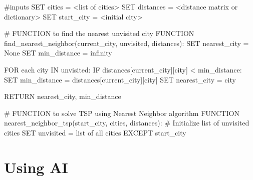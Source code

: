 \documentclass[
  letterpaper,
  DIV=11,
  numbers=noendperiod]{scrreprt}
\newenvironment{Shaded}{\begin{snugshade}}{\end{snugshade}}
\newcommand{\NormalTok}[1]{\textcolor[rgb]{0.00,0.23,0.31}{#1}}
\begin{document}
\begin{Shaded}
\begin{Highlighting}[]
\NormalTok{\#inputs}
\NormalTok{SET cities = \textless{}list of cities\textgreater{}}
\NormalTok{SET distances = \textless{}distance matrix or dictionary\textgreater{}}
\NormalTok{SET start\_city = \textless{}initial city\textgreater{}}


\NormalTok{\# FUNCTION to find the nearest unvisited city}
\NormalTok{FUNCTION find\_nearest\_neighbor(current\_city, unvisited, distances):}
\NormalTok{    SET nearest\_city = None}
\NormalTok{    SET min\_distance = infinity}
    
\NormalTok{    FOR each city IN unvisited:}
\NormalTok{        IF distances[current\_city][city] \textless{} min\_distance:}
\NormalTok{            SET min\_distance = distances[current\_city][city]}
\NormalTok{            SET nearest\_city = city}
    
\NormalTok{    RETURN nearest\_city, min\_distance}

\NormalTok{\# FUNCTION to solve TSP using Nearest Neighbor algorithm}
\NormalTok{FUNCTION nearest\_neighbor\_tsp(start\_city, cities, distances):}
\NormalTok{\# Initialize list of unvisited cities}
\NormalTok{    SET unvisited = list of all cities EXCEPT start\_city}
\end{Highlighting}
\end{Shaded}


\chapter{Using AI}\label{using-ai}
\end{document}

